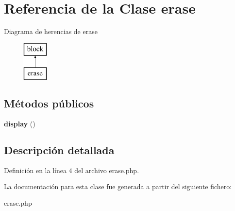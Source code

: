 \hypertarget{classerase}{\section{\-Referencia de la \-Clase erase}
\label{classerase}
}
\-Diagrama de herencias de erase\begin{figure}[H]
\begin{center}
\leavevmode
\includegraphics[height=2.000000cm]{classerase}
\end{center}
\end{figure}
\subsection*{\-Métodos públicos}
\begin{DoxyCompactItemize}
\item 
\hypertarget{classerase_a1d79faabec523c39a5662d10682acec8}{{\bfseries display} ()}\label{classerase_a1d79faabec523c39a5662d10682acec8}

\end{DoxyCompactItemize}


\subsection{\-Descripción detallada}


\-Definición en la línea 4 del archivo erase.\-php.



\-La documentación para esta clase fue generada a partir del siguiente fichero\-:\begin{DoxyCompactItemize}
\item 
erase.\-php\end{DoxyCompactItemize}
